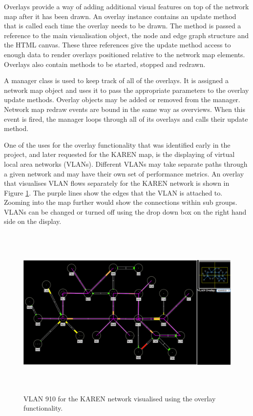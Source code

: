 \documentclass[11pt, a4paper]{article}
\begin{document}
Overlays provide a way of adding additional visual features on top of the
network map after it has been drawn. An overlay instance contains an update
method that is called each time the overlay needs to be drawn. The method is
passed a reference to the main visualisation object, the node and edge graph
structure and the HTML canvas. These three references give the update method
access to enough data to render overlays positioned relative to the network map
elements. Overlays also contain methods to be started, stopped and redrawn.

A manager class is used to keep track of all of the overlays. It is assigned a
network map object and uses it to pass the appropriate parameters to the overlay
update methods. Overlay objects may be added or removed from the manager.
Network map redraw events are bound in the same way as overviews. When this
event is fired, the manager loops through all of its overlays and calls their
update method. 

One of the uses for the overlay functionality that was identified early in the
project, and later requested for the KAREN map, is the displaying of virtual
local area networks (VLANs). Different VLANs may take separate paths through a
given network and may have their own set of performance metrics. An overlay that
visualises VLAN flows separately for the KAREN network is shown in Figure
\ref{fig:overlays1.0}. The purple lines show the edges that the VLAN is attached
to. Zooming into the map further would show the connections within sub groups.
VLANs can be changed or turned off using the drop down box on the right hand
side on the display.

\begin{figure} 
\centering
\includegraphics[width=170mm,height=85.71mm]{assets/overlays1-0.pdf}
\caption{VLAN 910 for the KAREN network visualised using the overlay
functionality.}
\label{fig:overlays1.0} 
\end{figure}
\end{document}
